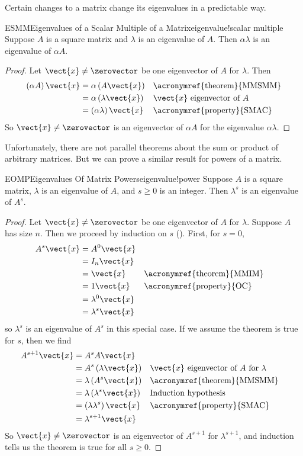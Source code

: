 %
Certain changes to a matrix change its eigenvalues in a predictable way.
%
\begin{theorem}{ESMM}{Eigenvalues of a Scalar Multiple of a Matrix}{eigenvalue!scalar multiple}
Suppose $A$ is a square matrix and $\lambda$ is an eigenvalue of $A$.  Then $\alpha\lambda$ is an eigenvalue of $\alpha A$.
\end{theorem}
%
\begin{proof}
%
Let $\vect{x}\neq\zerovector$ be one eigenvector of $A$ for $\lambda$.  Then
%
\begin{align*}
\left(\alpha A\right)\vect{x}&=\alpha\left(A\vect{x}\right)&&\text{\acronymref{theorem}{MMSMM}}\\
&=\alpha\left(\lambda\vect{x}\right)&&\text{$\vect{x}$ eigenvector of $A$}\\
&=\left(\alpha\lambda\right)\vect{x}&&\text{\acronymref{property}{SMAC}}
\end{align*}
%
So $\vect{x}\neq\zerovector$ is an eigenvector of $\alpha A$ for the eigenvalue $\alpha\lambda$.
\end{proof}
%
Unfortunately, there are not parallel theorems about the sum or product of arbitrary matrices.  But we can prove a similar result for powers of a matrix.
%
\begin{theorem}{EOMP}{Eigenvalues Of Matrix Powers}{eigenvalue!power}
Suppose $A$ is a square matrix, $\lambda$ is an eigenvalue of $A$, and $s\geq 0$ is an integer.  Then $\lambda^s$ is an eigenvalue of $A^s$.
\end{theorem}
%
\begin{proof}
%
Let $\vect{x}\neq\zerovector$ be one eigenvector of $A$ for $\lambda$.  Suppose $A$ has size $n$.  Then we proceed by induction on $s$ ().  First, for $s=0$, 
%
\begin{align*}
A^s\vect{x}&=A^0\vect{x}\\
&=I_n\vect{x}\\
&=\vect{x}&&\text{\acronymref{theorem}{MMIM}}\\
&=1\vect{x}&&\text{\acronymref{property}{OC}}\\
&=\lambda^0\vect{x}\\
&=\lambda^s\vect{x}\\
\end{align*}
%
so $\lambda^s$ is an eigenvalue of $A^s$ in this special case.  If we assume the theorem is true for $s$, then we find
%
\begin{align*}
A^{s+1}\vect{x}&=A^sA\vect{x}\\
&=A^s\left(\lambda\vect{x}\right)&&\text{$\vect{x}$ eigenvector of $A$ for $\lambda$}\\
&=\lambda\left(A^s\vect{x}\right)&&\text{\acronymref{theorem}{MMSMM}}\\
&=\lambda\left(\lambda^s\vect{x}\right)&&\text{Induction hypothesis}\\
&=\left(\lambda\lambda^s\right)\vect{x}&&\text{\acronymref{property}{SMAC}}\\
&=\lambda^{s+1}\vect{x}
\end{align*}
%
So $\vect{x}\neq\zerovector$ is an eigenvector of $A^{s+1}$ for $\lambda^{s+1}$, and induction tells us the theorem is true for all $s\geq 0$.
%
\end{proof}
